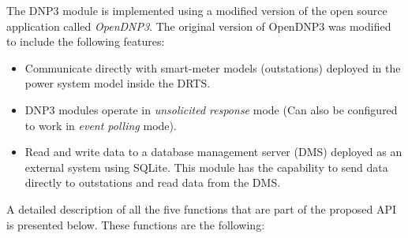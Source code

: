 The DNP3 module is implemented using a modified version of the open source application called \textit{OpenDNP3}. The original version of OpenDNP3 was modified to include the following features:

\begin{itemize}
    \item Communicate directly with smart-meter models (outstations) deployed in the power system model inside the DRTS. 
    
    \item DNP3 modules operate in \textit{unsolicited response} mode (Can also be configured to work in \textit{event polling} mode). 
    
    \item Read and write data to a database management server (DMS) deployed as an external system using SQLite. This module has the capability to send data directly to outstations and read data from the DMS.
\end{itemize}

A detailed description of all the five functions that are part of the proposed API is presented below. These functions are the following:

